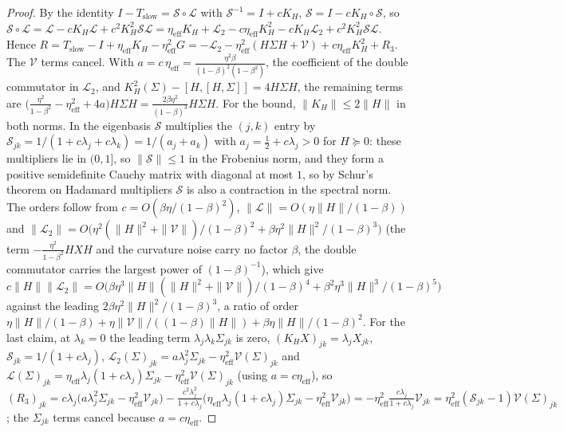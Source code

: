 \documentclass[11pt]{article}
\theoremstyle{remark}
\begin{document}
\begin{proof}
By the identity $I-T_{\mathrm{slow}}=\mathcal S\circ\mathcal L$ with $\mathcal S^{-1}=I+cK_H$, $\mathcal S=I-cK_H\circ\mathcal S$, so $\mathcal S\circ\mathcal L=\mathcal L-cK_H\mathcal L+c^2K_H^2\mathcal S\mathcal L=\eta_{\mathrm{eff}}K_H+\mathcal L_2-c\eta_{\mathrm{eff}}K_H^2-cK_H\mathcal L_2+c^2K_H^2\mathcal S\mathcal L$. Hence $R=T_{\mathrm{slow}}-I+\eta_{\mathrm{eff}}K_H-\eta_{\mathrm{eff}}^2G=-\mathcal L_2-\eta_{\mathrm{eff}}^2(H\Sigma H+\mathcal V)+c\eta_{\mathrm{eff}}K_H^2+R_3$. The $\mathcal V$ terms cancel. With $a=c\,\eta_{\mathrm{eff}}=\frac{\eta^2\beta}{(1-\beta)^2(1-\beta^2)}$, the coefficient of the double commutator in $\mathcal L_2$, and $K_H^2(\Sigma)-[H,[H,\Sigma]]=4H\Sigma H$, the remaining terms are $\big(\frac{\eta^2}{1-\beta^2}-\eta_{\mathrm{eff}}^2+4a\big)H\Sigma H=\frac{2\beta\eta^2}{(1-\beta)^3}H\Sigma H$. For the bound, $\|K_H\|\le2\|H\|$ in both norms. In the eigenbasis $\mathcal S$ multiplies the $(j,k)$ entry by $\mathcal S_{jk}=1/(1+c\lambda_j+c\lambda_k)=1/(a_j+a_k)$ with $a_j=\frac12+c\lambda_j>0$ for $H\succeq0$: these multipliers lie in $(0,1]$, so $\|\mathcal S\|\le1$ in the Frobenius norm, and they form a positive semidefinite Cauchy matrix with diagonal at most $1$, so by Schur's theorem on Hadamard multipliers $\mathcal S$ is also a contraction in the spectral norm. The orders follow from $c=O(\beta\eta/(1-\beta)^2)$, $\|\mathcal L\|=O(\eta\|H\|/(1-\beta))$ and $\|\mathcal L_2\|=O\big(\eta^2(\|H\|^2+\|\mathcal V\|)/(1-\beta)^2+\beta\eta^2\|H\|^2/(1-\beta)^3\big)$ (the term $-\frac{\eta^2}{1-\beta^2}HXH$ and the curvature noise carry no factor $\beta$, the double commutator carries the largest power of $(1-\beta)^{-1}$), which give $c\|H\|\|\mathcal L_2\|=O\big(\beta\eta^3\|H\|(\|H\|^2+\|\mathcal V\|)/(1-\beta)^4+\beta^2\eta^3\|H\|^3/(1-\beta)^5\big)$ against the leading $2\beta\eta^2\|H\|^2/(1-\beta)^3$, a ratio of order $\eta\|H\|/(1-\beta)+\eta\|\mathcal V\|/((1-\beta)\|H\|)+\beta\eta\|H\|/(1-\beta)^2$. For the last claim, at $\lambda_k=0$ the leading term $\lambda_j\lambda_k\Sigma_{jk}$ is zero, $(K_HX)_{jk}=\lambda_jX_{jk}$, $\mathcal S_{jk}=1/(1+c\lambda_j)$, $\mathcal L_2(\Sigma)_{jk}=a\lambda_j^2\Sigma_{jk}-\eta_{\mathrm{eff}}^2\mathcal V(\Sigma)_{jk}$ and $\mathcal L(\Sigma)_{jk}=\eta_{\mathrm{eff}}\lambda_j(1+c\lambda_j)\Sigma_{jk}-\eta_{\mathrm{eff}}^2\mathcal V(\Sigma)_{jk}$ (using $a=c\eta_{\mathrm{eff}}$), so $(R_3)_{jk}=c\lambda_j\big(a\lambda_j^2\Sigma_{jk}-\eta_{\mathrm{eff}}^2\mathcal V_{jk}\big)-\frac{c^2\lambda_j^2}{1+c\lambda_j}\big(\eta_{\mathrm{eff}}\lambda_j(1+c\lambda_j)\Sigma_{jk}-\eta_{\mathrm{eff}}^2\mathcal V_{jk}\big)=-\eta_{\mathrm{eff}}^2\frac{c\lambda_j}{1+c\lambda_j}\mathcal V_{jk}=\eta_{\mathrm{eff}}^2(\mathcal S_{jk}-1)\mathcal V(\Sigma)_{jk}$; the $\Sigma_{jk}$ terms cancel because $a=c\eta_{\mathrm{eff}}$.
\end{proof}
\end{document}

